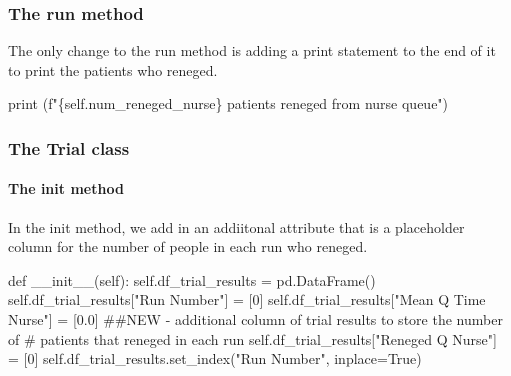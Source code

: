 \documentclass[
  letterpaper,
  DIV=11,
  numbers=noendperiod]{scrreprt}
\let\oldparagraph\paragraph
\renewcommand{\paragraph}[1]{\oldparagraph{#1}\mbox{}}
\newenvironment{Shaded}{}{}
\newcommand{\BuiltInTok}[1]{\textcolor[rgb]{0.84,0.23,0.29}{#1}}
\newcommand{\CommentTok}[1]{\textcolor[rgb]{0.42,0.45,0.49}{#1}}
\newcommand{\DecValTok}[1]{\textcolor[rgb]{0.00,0.36,0.77}{#1}}
\newcommand{\FloatTok}[1]{\textcolor[rgb]{0.00,0.36,0.77}{#1}}
\newcommand{\FunctionTok}[1]{\textcolor[rgb]{0.44,0.26,0.76}{#1}}
\newcommand{\KeywordTok}[1]{\textcolor[rgb]{0.84,0.23,0.29}{#1}}
\newcommand{\NormalTok}[1]{\textcolor[rgb]{0.14,0.16,0.18}{#1}}
\newcommand{\OperatorTok}[1]{\textcolor[rgb]{0.14,0.16,0.18}{#1}}
\newcommand{\SpecialCharTok}[1]{\textcolor[rgb]{0.00,0.36,0.77}{#1}}
\newcommand{\SpecialStringTok}[1]{\textcolor[rgb]{0.01,0.18,0.38}{#1}}
\newcommand{\StringTok}[1]{\textcolor[rgb]{0.01,0.18,0.38}{#1}}
\newcommand{\VariableTok}[1]{\textcolor[rgb]{0.89,0.38,0.04}{#1}}
\begin{document}
\subsubsection{The run method}\label{the-run-method-4}

The only change to the run method is adding a print statement to the end
of it to print the patients who reneged.

\begin{Shaded}
\begin{Highlighting}[]
\BuiltInTok{print}\NormalTok{ (}\SpecialStringTok{f"}\SpecialCharTok{\{}\VariableTok{self}\SpecialCharTok{.}\NormalTok{num\_reneged\_nurse}\SpecialCharTok{\}}\SpecialStringTok{ patients reneged from nurse queue"}\NormalTok{)}
\end{Highlighting}
\end{Shaded}

\subsubsection{The Trial class}\label{the-trial-class-4}

\paragraph{\texorpdfstring{The \textbf{init}
method}{The init method}}\label{the-init-method-3}

In the init method, we add in an addiitonal attribute that is a
placeholder column for the number of people in each run who reneged.

\begin{Shaded}
\begin{Highlighting}[]
\KeywordTok{def}  \FunctionTok{\_\_init\_\_}\NormalTok{(}\VariableTok{self}\NormalTok{):}
    \VariableTok{self}\NormalTok{.df\_trial\_results }\OperatorTok{=}\NormalTok{ pd.DataFrame()}
    \VariableTok{self}\NormalTok{.df\_trial\_results[}\StringTok{"Run Number"}\NormalTok{] }\OperatorTok{=}\NormalTok{ [}\DecValTok{0}\NormalTok{]}
    \VariableTok{self}\NormalTok{.df\_trial\_results[}\StringTok{"Mean Q Time Nurse"}\NormalTok{] }\OperatorTok{=}\NormalTok{ [}\FloatTok{0.0}\NormalTok{]}
    \CommentTok{\#\#NEW {-} additional column of trial results to store the number of}
    \CommentTok{\# patients that reneged in each run}
    \VariableTok{self}\NormalTok{.df\_trial\_results[}\StringTok{"Reneged Q Nurse"}\NormalTok{] }\OperatorTok{=}\NormalTok{ [}\DecValTok{0}\NormalTok{]}
    \VariableTok{self}\NormalTok{.df\_trial\_results.set\_index(}\StringTok{"Run Number"}\NormalTok{, inplace}\OperatorTok{=}\VariableTok{True}\NormalTok{)}
\end{Highlighting}
\end{Shaded}
\end{document}

